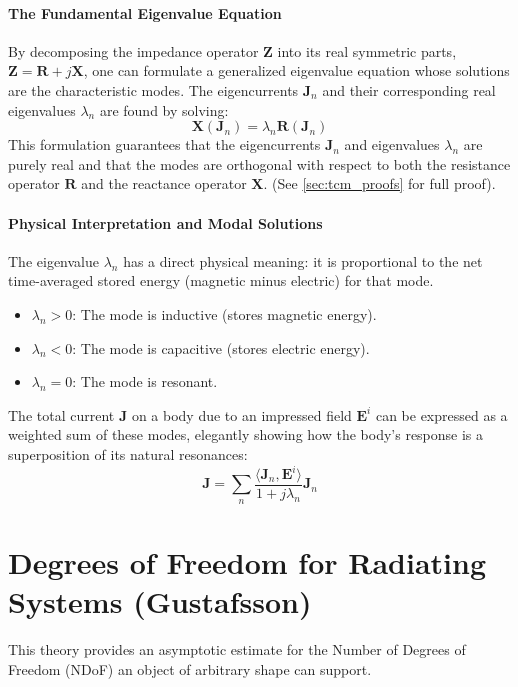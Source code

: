 \documentclass[11pt, a4paper]{report}
\begin{document}
\paragraph{The Fundamental Eigenvalue Equation}
By decomposing the impedance operator $\mathbf{Z}$ into its real symmetric parts, $\mathbf{Z} = \mathbf{R} + j\mathbf{X}$, one can formulate a generalized eigenvalue equation whose solutions are the characteristic modes. The eigencurrents $\mathbf{J}_n$ and their corresponding real eigenvalues $\lambda_n$ are found by solving:
\begin{equation} \label{eq:tcm_eigen_main}
    \mathbf{X}(\mathbf{J}_n) = \lambda_n \mathbf{R}(\mathbf{J}_n)
\end{equation}
This formulation guarantees that the eigencurrents $\mathbf{J}_n$ and eigenvalues $\lambda_n$ are purely real and that the modes are orthogonal with respect to both the resistance operator $\mathbf{R}$ and the reactance operator $\mathbf{X}$. (See \cref{sec:tcm_proofs} for full proof).

\paragraph{Physical Interpretation and Modal Solutions}
The eigenvalue $\lambda_n$ has a direct physical meaning: it is proportional to the net time-averaged stored energy (magnetic minus electric) for that mode.
\begin{itemize}
    \item $\lambda_n > 0$: The mode is inductive (stores magnetic energy).
    \item $\lambda_n < 0$: The mode is capacitive (stores electric energy).
    \item $\lambda_n = 0$: The mode is resonant.
\end{itemize}
The total current $\mathbf{J}$ on a body due to an impressed field $\mathbf{E}^i$ can be expressed as a weighted sum of these modes, elegantly showing how the body's response is a superposition of its natural resonances:
\begin{equation}
    \mathbf{J} = \sum_n \frac{\langle \mathbf{J}_n, \mathbf{E}^i \rangle}{1+j\lambda_n} \mathbf{J}_n
\end{equation}

\section{Degrees of Freedom for Radiating Systems (Gustafsson)}
This theory provides an asymptotic estimate for the Number of Degrees of Freedom (NDoF) an object of arbitrary shape can support.
\end{document}
